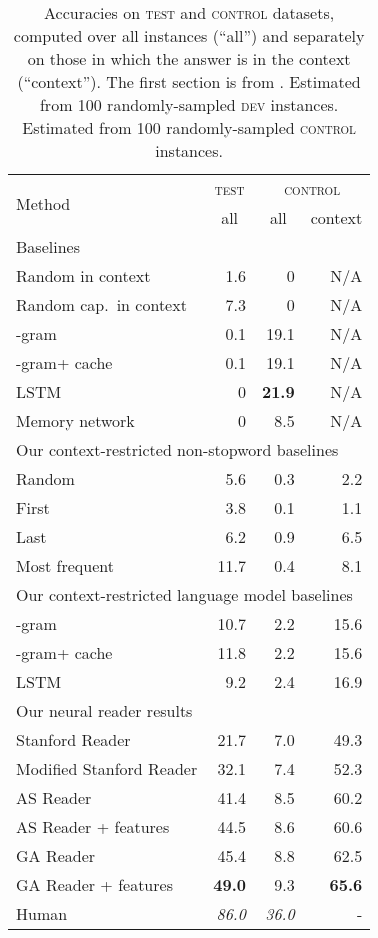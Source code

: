\documentclass[11pt]{article}
\newcommand{\control}{\textsc{control}\xspace}
\newcommand{\dev}{\textsc{dev}\xspace}
\newcommand{\test}{\textsc{test}\xspace}
\newcommand{\ngram}{-gram\xspace}
\begin{document}
\begin{table}[t]
\small
\begin{center}
\begin{tabular}{|l|r|rr|}
\hline 
\multirow{2}{*}{Method} & \multicolumn{1}{|c|}{\test} & \multicolumn{2}{|c|}{\control} \\
 & \multicolumn{1}{c}{all} & \multicolumn{1}{|c}{all} & \multicolumn{1}{c|}{context} \\
\hline
\multicolumn{4}{|l|}{Baselines \cite{lambada:16}}\\
\hline
Random in context & 1.6 & 0 &  N/A \\ 
Random cap.~in context & 7.3 & 0 &  N/A \\
\ngram & 0.1 & 19.1 & N/A  \\
\ngram + cache & 0.1 & 19.1 & N/A \\
LSTM & 0 & \textbf{21.9} & N/A \\
Memory network & 0 & 8.5 & N/A \\
\hline
\multicolumn{4}{|l|}{Our context-restricted non-stopword baselines} \\
\hline
Random & 5.6 & 0.3 & 2.2 \\
First & 3.8 & 0.1 & 1.1 \\
Last & 6.2 & 0.9 & 6.5 \\
Most frequent & 11.7 & 0.4 & 8.1 \\
\hline
\multicolumn{4}{|l|}{Our context-restricted language model baselines} \\
\hline
\ngram & 10.7 & 2.2 & 15.6 \\
\ngram + cache & 11.8 & 2.2 & 15.6 \\
LSTM &9.2 & 2.4 & 16.9 \\
\hline
\multicolumn{4}{|l|}{Our neural reader results} \\
\hline
Stanford Reader &  21.7 & 7.0 & 49.3 \\
Modified Stanford Reader & 32.1 & 7.4 & 52.3 \\
AS Reader & 41.4 & 8.5 & 60.2 \\
AS Reader + features & 44.5 & 8.6 & 60.6 \\
GA Reader & 45.4 & 8.8 & 62.5 \\
GA Reader + features & \bf 49.0 & 9.3 & \bf 65.6 \\
\hline
Human & {\it 86.0} & {\it 36.0} & - \\
\hline
\end{tabular}
\end{center}
\caption{\label{accuracy-table} Accuracies on \test and \control datasets, computed over all instances (``all'') and separately on those in which the answer is in the context (``context''). The first section is from . Estimated from 100 randomly-sampled \dev instances. Estimated from 100 randomly-sampled \control instances. 
} 
\vspace{-0.4cm}
\end{table}
\end{document}
